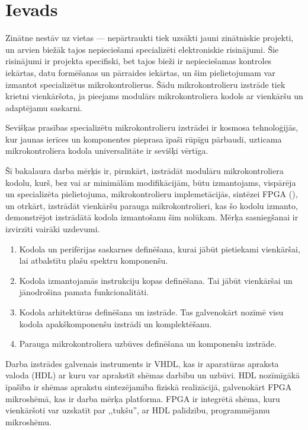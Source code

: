 \section*{Ievads} 
Zinātne nestāv uz vietas --- nepārtraukti tiek uzsākti jauni zinātniskie projekti,
un arvien biežāk tajos nepieciešami specializēti elektroniskie risinājumi.
Šie risinājumi ir projekta specifiski, bet tajos bieži ir nepieciešamas
kontroles iekārtas, datu formēšanas un pārraides iekārtas, un
šim pielietojumam var izmantot specializētus mikrokontrolierus.
Šādu mikrokontrolieru izstrāde tiek krietni vienkāršota, ja pieejams
modulārs mikrokontroliera kodols ar vienkāršu un adaptējamu saskarni.

Sevišķas prasības specializētu mikrokontrolieru izstrādei ir kosmosa
tehnoloģijās, kur jaunas ierīces un komponentes pieprasa īpaši rūpīgu
pārbaudi, uzticama mikrokontroliera kodola universalitāte ir sevišķi
vērtīga.

Šī bakalaura darba mērķis ir, pirmkārt, izstrādāt modulāru mikrokontroliera kodolu,
kurš, bez vai ar minimālām modifikācijām, būtu izmantojams,
vispārēja un specializēta pielietojuma, mikrokontrolieru implemetācijās,
sintēzei FPGA (), un otrkārt,
izstrādāt vienkāršu parauga mikrokontrolieri, kas šo kodolu izmanto,
demonstrējot izstrādātā kodola izmantošanu šim nolūkam.
Mērķa sasniegšanai ir izvirzīti vairāki uzdevumi.
\begin{enumerate}
	\item Kodola un perifērijas saskarnes definēšana,
		kurai jābūt pietiekami vienkāršai, lai atbalstītu plašu spektru
		komponenšu.
	\item Kodola izmantojamās instrukciju kopas definēšana. Tai jābūt
		vienkāršai un jānodrošina pamata funkcionalitāti.
	\item Kodola arhitektūras definēšana un izstrāde. Tas galvenokārt nozīmē
		visu kodola apakškomponenšu izstrādi un komplektēšanu.
	\item Parauga mikrokontroliera uzbūves definēšana un komponenšu izstrāde.
\end{enumerate}

Darba izstrādes galvenais instruments ir VHDL, kas ir
aparatūras apraksta valoda (HDL) ar kuru var aprakstīt shēmas darbību un uzbūvi.
HDL nozīmīgākā īpašība ir shēmas aprakstu sintezējamība fiziskā realizācijā,
galvenokārt FPGA mikroshēmā, kas ir darba mērķa platforma.
FPGA ir integrētā shēma, kuru vienkāršoti var 
uzskatīt par ,,tukšu'', ar HDL palīdzību, programmējamu mikroshēmu.

